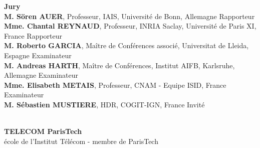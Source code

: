 \documentclass[11pt,a4paper]{book}
\begin{document}
%
%
%
\vfill
%
%
%
\flushleft
\begin{minipage}{.9\textwidth}	%
{\bf Jury}\\
{\bf M. Sören AUER}, {\small Professeur, IAIS, Université de Bonn, Allemagne}
	\hfill Rapporteur\\
{\bf Mme. Chantal REYNAUD}, {\small Professeur, INRIA Saclay, Université de Paris XI, France}
	\hfill Rapporteur\\
{\bf M. Roberto GARCIA}, {\small Maître de Conférences associé, Universitat de Lleida, Espagne }
	\hfill Examinateur\\
{\bf M. Andreas HARTH}, {\small Maître de Conférences, Institut AIFB, Karlsruhe, Allemagne}
	\hfill Examinateur\\
{\bf Mme. Elisabeth METAIS}, {\small Professeur, CNAM - Equipe ISID, France}
	\hfill Examinateur\\
{\bf M. Sébastien MUSTIERE}, {\small HDR, COGIT-IGN, France}
	\hfill Invité\\

\end{minipage}\\
%
%
%
%
%
%
\centering
{\bf TELECOM ParisTech}\\
{\small école de l'Institut Télécom - membre de ParisTech}
%
%
%
\end{document}
